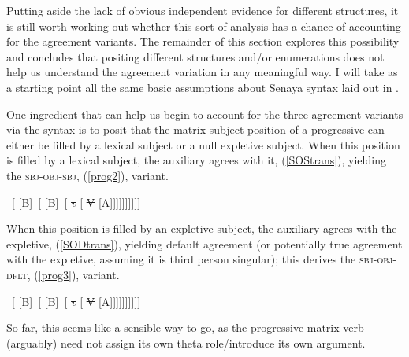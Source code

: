 \documentclass[output=paper
,modfonts
,nonflat]{langsci/langscibook}
\begin{document}
Putting aside the lack of obvious independent evidence for different structures, it is still worth working out whether this sort of analysis has a chance of accounting for the agreement variants. The remainder of this section explores this possibility and concludes that positing different structures and/or enumerations does not help us understand the agreement variation in any meaningful way. I will take as a starting point all the same basic assumptions about Senaya syntax laid out in . 

One ingredient that can help us begin to account for the three agreement variants via the syntax is to posit that the matrix subject position of a progressive can either be filled by a lexical subject or a null expletive subject. When this position is filled by a lexical subject, the auxiliary agrees with it, (\ref{SOStrans}), yielding the \textsc{sbj-obj-sbj}, (\ref{prog2}), variant.
	
\begin{exe}
		\ex \label{SOStrans}\relax
		[ \ConnectDashTail{SBJ\sub{i}} \ \ConnectDashHead*{V+\textit{v}+Asp+T}\relax\  [ \sout{Asp} [ \sout{\textit{v}} [ \sout{V} [ \ConnectDashTail{T}[A]\relax\  [ [B]\relax\  [ [B]\relax\  [ \sout{\textit{v}} [ \sout{V} [A]\relax ]]]]]]]]]
\end{exe}
	
\noindent When this position is filled by an expletive subject, the auxiliary agrees with the expletive, (\ref{SODtrans}),  yielding default agreement (or potentially true agreement with the expletive, assuming it is third person singular); this derives the \textsc{sbj-obj-dflt}, (\ref{prog3}), variant.

	\begin{exe}
		\ex \label{SODtrans}\relax
		[ \ConnectDashTail{EXPL}\ \ConnectDashHead*{V+\textit{v}+Asp+T}\relax\ [ \sout{Asp} [ \sout{\textit{v}} [ \sout{V} [ \ConnectDashTail{T}[A]\relax\ [ [B]\relax\ [ [B]\relax\ [ \sout{\textit{v}} [ \sout{V} [A]\relax ]]]]]]]]]
	\end{exe}
	
\noindent So far, this seems like a sensible way to go, as the progressive matrix verb (arguably) need not assign its own theta role/introduce its own argument.
\end{document}
